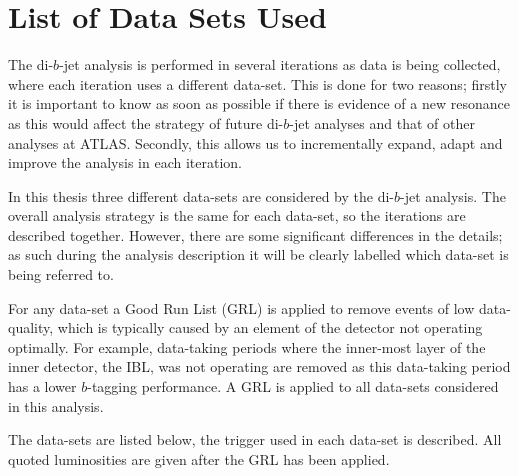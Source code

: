 \section{List of Data Sets Used}
\label{sec:evt-datasets}

The di-$b$-jet analysis is performed in several iterations
as data is being collected, where each iteration uses a different data-set.
This is done for two reasons;
firstly it is important to know as soon as possible
if there is evidence of a new resonance as
this would affect the strategy of future di-$b$-jet analyses and that of other analyses at ATLAS.
Secondly, this allows us to incrementally
expand, adapt and improve the analysis in each iteration.

In this thesis three different data-sets are considered by the di-$b$-jet analysis.
The overall analysis strategy is the same for each data-set,
so the iterations are described together.
However, there are some significant differences in the details;
as such during the analysis description it will be clearly labelled
which data-set is being referred to.

For any data-set a Good Run List (GRL)
is applied to remove events of low data-quality,
which is typically caused by an element of the detector not operating optimally.
For example, data-taking periods where the inner-most layer of the inner detector,
the IBL, was not operating are removed as
this data-taking period has a lower $b$-tagging performance.
A GRL is applied to all data-sets considered in this analysis.

The data-sets are listed below, the trigger used in each data-set is described.
All quoted luminosities are given after the GRL has been applied.


